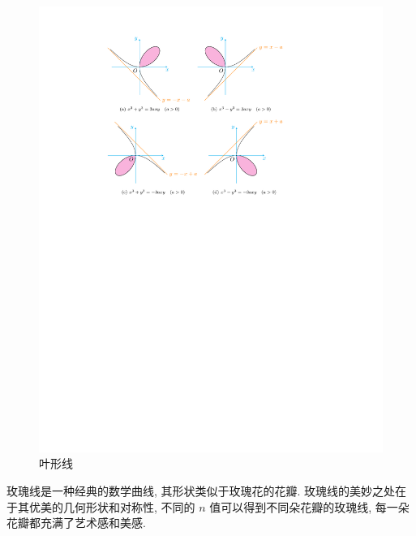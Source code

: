 \begin{figure}[H]
    \centering
    \includegraphics{figures/LeafLinear.pdf}
    \caption{叶形线}
    \label{leafLinear}
\end{figure}


玫瑰线是一种经典的数学曲线, 其形状类似于玫瑰花的花瓣. 玫瑰线的美妙之处在于其优美的几何形状和对称性, 不同的 $n$ 值可以得到不同朵花瓣的玫瑰线, 每一朵花瓣都充满了艺术感和美感.

